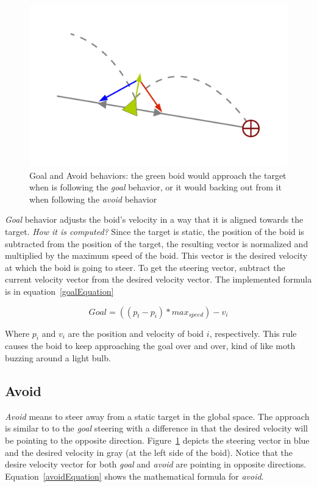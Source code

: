 \begin{figure}[htbp]
\begin{center}
\includegraphics[scale=0.5]{figures/seekANDflee.pdf}
\caption{Goal and Avoid behaviors: the green boid would approach the target when is following the \textit{goal} behavior, or it would backing out from it when following the \textit{avoid} behavior }
\label{seekfleePDF}
\end{center}
\end{figure}

\textit{Goal} behavior adjusts the boid's velocity in a way that it is aligned towards the target. \textit{How it is computed?} Since the target is static, the position of the boid is subtracted from the position of the target, the resulting vector is normalized and multiplied by the maximum speed of the boid. This vector is the desired velocity at which the boid is going to steer. To get the steering vector, subtract the current velocity vector from the desired velocity vector. The implemented formula is in equation~\ref{goalEquation}

\begin{equation}
\label{goalEquation}
Goal = ((p_t - p_i) * max_{speed}) - v_i
\end{equation}

Where $p_i$ and $v_i$ are the position and velocity of boid $i$, respectively. This rule causes the boid to keep approaching the goal over and over, kind of like moth buzzing around a light bulb.

\subsection{Avoid}
\textit{Avoid} means to steer away from a static target in the global space. The approach is similar to to the \textit{goal} steering with a difference in that the desired velocity will be pointing to the opposite direction. Figure~\ref{seekfleePDF} depicts the steering vector in blue and the desired velocity in gray (at the left side of the boid). Notice that the desire velocity vector for both \textit{goal} and \textit{avoid} are pointing in opposite directions. Equation~\ref{avoidEquation} shows the mathematical formula for \textit{avoid}.

